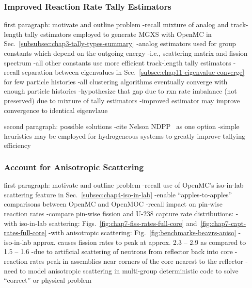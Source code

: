 \subsubsection{Improved Reaction Rate Tally Estimators}
\label{subsubsec:chap12-tally-estimators}

first paragraph: motivate and outline problem
-recall mixture of analog and track-length tally estimators employed to generate \ac{MGXS} with OpenMC in Sec.~\ref{subsubsec:chap3-tally-types-summary}
  -analog estimators used for group constants which depend on the outgoing energy
    -i.e., scattering matrix and fission spectrum
  -all other constants use more efficient track-length tally estimators
-recall separation between eigenvalues in Sec.~\ref{subsec:chap11-eigenvalue-converge} for few particle histories
  -all clustering algorithms eventually converge with enough particle histories
  -hypothesize that gap due to rxn rate imbalance (not preserved) due to mixture of tally estimators  
  -improved estimator may improve convergence to identical eigenvlaue

second paragraph: possible solutions
-cite Nelson NDPP~\cite{nelson2014improved} as one option
-simple heuristics may be employed for hydrogeneous systems to greatly improve tallying efficiency

\subsubsection{Account for Anisotropic Scattering}
\label{subsubsec:chap12-transport-mgxs}

first paragraph: motivate and outline problem
-recall use of OpenMC's iso-in-lab scattering feature in Sec.~\ref{subsec:chap4-iso-in-lab}
  -enable ``apples-to-apples'' comparisons between OpenMC and OpenMOC
-recall impact on pin-wise reaction rates
  -compare pin-wise fission and U-238 capture rate distributions:
    -with iso-in-lab scattering: Figs.~\ref{fig:chap7-fiss-rates-full-core} and~\ref{fig:chap7-capt-rates-full-core}
    -with anisotropic scattering: Fig.~\ref{fig:benchmarks-beavrs-aniso}
  -iso-in-lab approx. causes fission rates to peak at approx. 2.3 -- 2.9 as compared to 1.5 -- 1.6
    -due to artificial scattering of neutrons from reflector back into core
    -reaction rates peak in assemblies near corners of the core nearest to the reflector
-need to model anisotropic scattering in multi-group deterministic code to solve ``correct'' or physical problem

